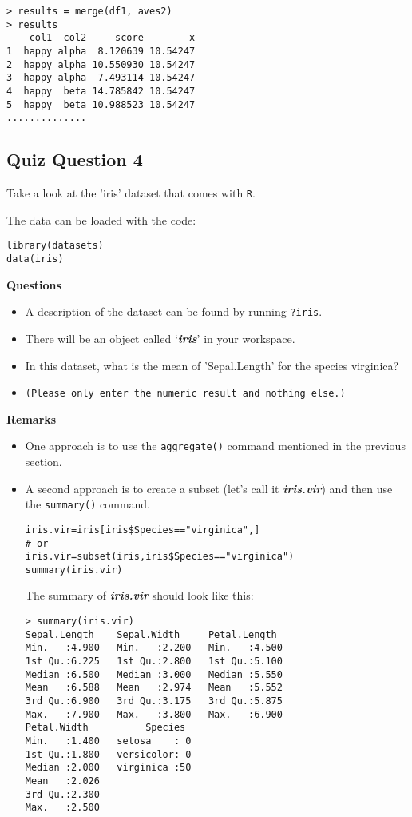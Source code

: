 \documentclass[12pt]{article}
\begin{document}
\begin{verbatim}
> results = merge(df1, aves2) 
> results
    col1  col2     score        x
1  happy alpha  8.120639 10.54247
2  happy alpha 10.550930 10.54247
3  happy alpha  7.493114 10.54247
4  happy  beta 14.785842 10.54247
5  happy  beta 10.988523 10.54247
..............
\end{verbatim}
\newpage
\subsection*{Quiz Question 4}
Take a look at the 'iris' dataset that comes with \texttt{R}. 

The data can be loaded with the code:
\begin{framed}
\begin{verbatim}
library(datasets)
data(iris)
\end{verbatim}
\end{framed}
\noindent \textbf{Questions}
\begin{itemize}
\item A description of the dataset can be found by running \texttt{?iris}.
\item 
There will be an object called `\textit{\textbf{iris}}' in your workspace. 
\item In this dataset, what is the mean of 'Sepal.Length' for the species virginica?
\item \texttt{(Please only enter the numeric result and nothing else.)}
\end{itemize}
\newpage
\textbf{Remarks}
\begin{itemize}
\item One approach is to use the \texttt{aggregate()} command mentioned in the previous section.
\item A second approach is to create a subset (let's call it \textit{\textbf{iris.vir}}) and then use the \texttt{summary()} command.
\begin{framed}
\begin{verbatim}
iris.vir=iris[iris$Species=="virginica",]
# or
iris.vir=subset(iris,iris$Species=="virginica")
summary(iris.vir)
\end{verbatim}
\end{framed}

The summary of \textit{\textbf{iris.vir}} should look like this:
\begin{verbatim}
> summary(iris.vir)
Sepal.Length    Sepal.Width     Petal.Length  
Min.   :4.900   Min.   :2.200   Min.   :4.500  
1st Qu.:6.225   1st Qu.:2.800   1st Qu.:5.100  
Median :6.500   Median :3.000   Median :5.550  
Mean   :6.588   Mean   :2.974   Mean   :5.552  
3rd Qu.:6.900   3rd Qu.:3.175   3rd Qu.:5.875  
Max.   :7.900   Max.   :3.800   Max.   :6.900  
Petal.Width          Species  
Min.   :1.400   setosa    : 0  
1st Qu.:1.800   versicolor: 0  
Median :2.000   virginica :50  
Mean   :2.026                  
3rd Qu.:2.300                  
Max.   :2.500                  
\end{verbatim}
\end{itemize}
\end{document}
